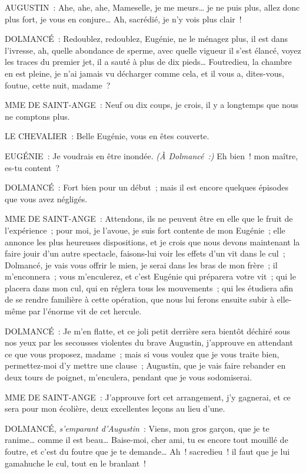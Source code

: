 \documentclass[french,twoside]{book} %
\begin{document}
AUGUSTIN : Ahe, ahe, ahe, Mameselle, je me meurs… je ne puis plus, allez donc plus fort, je vous en conjure… Ah, sacrédié, je n’y vois plus clair !\par
DOLMANCÉ : Redoublez, redoublez, Eugénie, ne le ménagez plus, il est dans l’ivresse, ah, quelle abondance de sperme, avec quelle vigueur il s’est élancé, voyez les traces du premier jet, il a sauté à plus de dix pieds… Foutredieu, la chambre en est pleine, je n’ai jamais vu décharger comme cela, et il vous a, dites-vous, foutue, cette nuit, madame ?\par
MME DE SAINT-ANGE : Neuf ou dix coups, je crois, il y a longtemps que nous ne comptons plus.\par
LE CHEVALIER : Belle Eugénie, vous en êtes couverte.\par
EUGÉNIE : Je voudrais en être inondée. {\itshape (À Dolmancé :)} Eh bien ! mon maître, es-tu content ?\par
DOLMANCÉ : Fort bien pour un début ; mais il est encore quelques épisodes que vous avez négligés.\par
MME DE SAINT-ANGE : Attendons, ils ne peuvent être en elle que le fruit de l’expérience ; pour moi, je l’avoue, je suis fort contente de mon Eugénie ; elle annonce les plus heureuses dispositions, et je crois que nous devons maintenant la faire jouir d’un autre spectacle, faisons-lui voir les effets d’un vit dans le cul ; Dolmancé, je vais vous offrir le mien, je serai dans les bras de mon frère ; il m’enconnera ; vous m’enculerez, et c’est Eugénie qui préparera votre vit ; qui le placera dans mon cul, qui en réglera tous les mouvements ; qui les étudiera afin de se rendre familière à cette opération, que nous lui ferons ensuite subir à elle-même par l’énorme vit de cet hercule.\par
DOLMANCÉ : Je m’en flatte, et ce joli petit derrière sera bientôt déchiré sous nos yeux par les secousses violentes du brave Augustin, j’approuve en attendant ce que vous proposez, madame ; mais si vous voulez que je vous traite bien, permettez-moi d’y mettre une clause ; Augustin, que je vais faire rebander en deux tours de poignet, m’enculera, pendant que je vous sodomiserai.\par
MME DE SAINT-ANGE : J’approuve fort cet arrangement, j’y gagnerai, et ce sera pour mon écolière, deux excellentes leçons au lieu d’une.\par
DOLMANCÉ, {\itshape s’emparant d’Augustin} : Viens, mon gros garçon, que je te ranime… comme il est beau… Baise-moi, cher ami, tu es encore tout mouillé de foutre, et c’est du foutre que je te demande… Ah ! sacredieu ! il faut que je lui gamahuche le cul, tout en le branlant !\par
\end{document}
